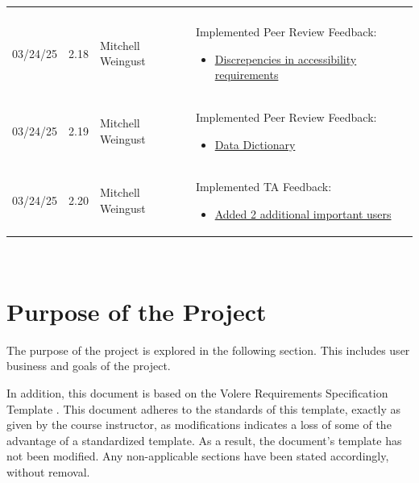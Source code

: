 \documentclass[12pt]{article}
\begin{document}
\begin{table}[H]
\begin{tabularx}{\textwidth}{p{1.5cm} p{1cm} p{3.5cm} X}
\begin{itemize}[leftmargin=*]
      \end{itemize} \\
      03/24/25 & 2.18 & Mitchell Weingust & Implemented Peer Review Feedback: 
      \begin{itemize}[leftmargin=*]
        \item \href{https://github.com/parishanizam/TeleHealth/issues/125}{Discrepencies in accessibility requirements}
      \end{itemize} \\
      03/24/25 & 2.19 & Mitchell Weingust & Implemented Peer Review Feedback: 
      \begin{itemize}[leftmargin=*]
        \item \href{https://github.com/parishanizam/TeleHealth/issues/120}{Data Dictionary}
      \end{itemize} \\
      03/24/25 & 2.20 & Mitchell Weingust & Implemented TA Feedback: 
      \begin{itemize}[leftmargin=*]
        \item \href{https://github.com/parishanizam/TeleHealth/issues/197}{Added 2 additional important users}
      \end{itemize} \\
    \end{tabularx}
  \end{table}

~\newpage
{}

\section{Purpose of the Project}

\noindent\hspace{2em}The purpose of the project is explored in the following section. This includes
user business and goals of the project.

\noindent\hspace{2em}In addition, this document is based on the Volere Requirements Specification Template \cite{volere}. This document adheres to the standards of this template,
exactly as given by the course instructor, as modifications indicates a loss of some of the advantage of a standardized template. As a result, the document's
template has not been modified. Any non-applicable sections have been stated accordingly, without removal.
\end{document}
